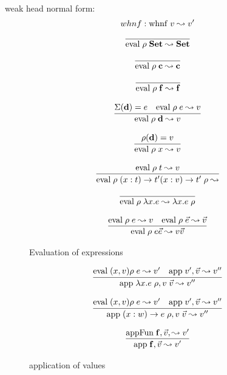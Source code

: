 weak head normal form: 
\[ whnf : \mathrm{whnf}\;v\leadsto v' \]
\begin{figure}

\[\begin{array}{c}
	  \infer{\Eval{\rho}{\Set}{\Set}} 
          {} 
\end{array}
\]

\[
\begin{array}{c}
	  \infer{\Eval{\rho}{\cc}{\cc}} 
          {}

\end{array}
\]

\[\begin{array}{c}
	  \infer{\Eval{\rho}{\ff}{\ff}} 
          {} 
\end{array}
\]

\[\begin{array}{c}
	  \infer{\Eval{\rho}{\dd}{v}} 
          {\Lookup{\Sigma}{\dd}{e} & \Eval{\rho}{e}{v}} 
\end{array}
\]

\[\begin{array}{c}
	  \infer{\Eval{\rho}{x}{v}} 
          {\Lookup{\rho}{\dd}{v}} 
\end{array}
\]

\[\begin{array}{c}
	  \infer{\Eval{\rho}{\EPi{x}{t}{t'}{\VPi{x}{v}{t'}{\rho}}}}
          {\Eval{\rho}{t}{v}}
\end{array}
\]

\[\begin{array}{c}
	  \infer{\Eval{\rho}{\lam x . e}{\VLam{x}{e}{\rho}}}
		{} 
\end{array}
\]


\[
\begin{array}{c}
          
	  \infer{\Eval{\rho}{e \vec{e}}{v \vec{v}}}
          {\Eval{\rho}{e}{v} & \Eval{\rho}{\vec{e}}{\vec{v}}}
\end{array}
\]
\caption{Evaluation of expressions}
\end{figure}

\begin{figure}

\[
\begin{array}{c}
          
	  \infer{\App{\VLam{x}{e}{\rho}}{v \; \vec{v}}{v''}}
          {\Eval{(x,v)\rho}{e}{v'} & \App{v'}{\vec{v}}{v''}}
\end{array}
\]

\[
\begin{array}{c}
          
	  \infer{\App{\VPi{x}{w}{e}{\rho}}{v \; \vec{v}}{v''}}
          {\Eval{(x,v)\rho}{e}{v'} & \App{v'}{\vec{v}}{v''}}

\end{array}
\]

\[
\begin{array}{c}
          
	  \infer{\App{\ff}{\vec{v}}{v'}}
          {\AppFun{\ff}{\vec{v}}{v'}}
\end{array}
\]

\caption{application of values}
\end{figure}


